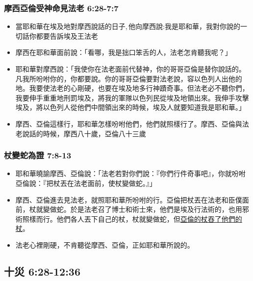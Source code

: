 \subsubsection{摩西亞倫受神命見法老 6:28-7:7}
\begin{itemize} 
\itemsep-.35em 
\item 當耶和華在埃及地對摩西說話的日子, 他向摩西說:我是耶和華，我對你說的一切話你都要告訴埃及王法老
\item 摩西在耶和華面前說：「看哪，我是拙口笨舌的人，法老怎肯聽我呢？」
\item 耶和華對摩西說：「我使你在法老面前代替神，你的哥哥亞倫是替你說話的。凡我所吩咐你的，你都要說。你的哥哥亞倫要對法老說，容以色列人出他的地。我要使法老的心剛硬，也要在埃及地多行神蹟奇事。但法老必不聽你們，我要伸手重重地刑罰埃及，將我的軍隊以色列民從埃及地領出來。我伸手攻擊埃及，將以色列人從他們中間領出來的時候，埃及人就要知道我是耶和華。」
\item 摩西、亞倫這樣行，耶和華怎樣吩咐他們，他們就照樣行了。摩西、亞倫與法老說話的時候，摩西八十歲，亞倫八十三歲
\end{itemize}

\subsubsection{杖變蛇為證 7:8-13}
\begin{itemize} 
\itemsep-.35em 
\item 耶和華曉諭摩西、亞倫說：「法老若對你們說：『你們行件奇事吧』，你就吩咐亞倫說：『把杖丟在法老面前，使杖變做蛇。』」
\item 摩西、亞倫進去見法老，就照耶和華所吩咐的行。亞倫把杖丟在法老和臣僕面前，杖就變做蛇。於是法老召了博士和術士來，他們是埃及行法術的，也用邪術照樣而行。他們各人丟下自己的杖，杖就變做蛇，但\underline{亞倫的杖吞了他們的杖}。
\item 法老心裡剛硬，不肯聽從摩西、亞倫，正如耶和華所說的。
\end{itemize}

\subsection{十災 6:28-12:36}



